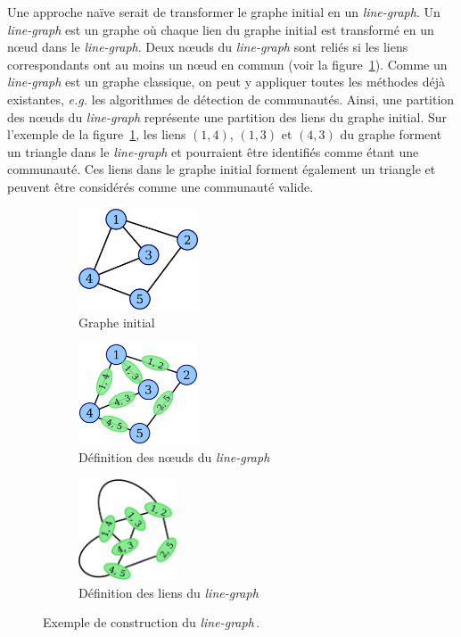 Une approche naïve serait de transformer le graphe initial en un \emph{line-graph}.
Un \emph{line-graph} est un graphe où chaque lien du graphe initial est transformé en un n\oe{}ud dans le \emph{line-graph}.
Deux n\oe{}uds du \emph{line-graph} sont reliés si les liens correspondants ont au moins un n\oe{}ud en commun (voir la figure~\ref{fig:ex_construction_lineG}).
Comme un \emph{line-graph} est un graphe classique, on peut y appliquer toutes les méthodes déjà existantes, \emph{e.g.} les algorithmes de détection de communautés.
Ainsi, une partition des n\oe{}uds du \emph{line-graph} représente une partition des liens du graphe initial.
Sur l'exemple de la figure~\ref{fig:ex_construction_lineG}, les liens $(1,4)$, $(1,3)$ et $(4, 3)$ du graphe forment un triangle dans le \emph{line-graph} et pourraient être identifiés comme étant une communauté.
Ces liens dans le graphe initial forment également un triangle et peuvent être considérés comme une communauté valide.
\begin{figure}
\centering
	\begin{subfigure}{0.25\textwidth}
		\includegraphics[height=3cm]{img/ExpectedNodes/Line_graph_construction_1.eps}
		\caption{Graphe initial}
	\end{subfigure}\hspace*{0.5cm}
	\begin{subfigure}{0.25\textwidth}
		\includegraphics[height=3cm]{img/ExpectedNodes/Line_graph_construction_2.eps}
		\caption{Définition des n\oe{}uds du \emph{line-graph}}
	\end{subfigure}\hspace*{0.5cm}
	\begin{subfigure}{0.25\textwidth}
		\includegraphics[height=3cm]{img/ExpectedNodes/Line_graph_construction_3.eps}
		\caption{Définition des liens du \emph{line-graph}}
	\end{subfigure}	
	\caption{Exemple de construction du \emph{line-graph}\,\protect\footnotemark.}
	\label{fig:ex_construction_lineG}
\end{figure}

